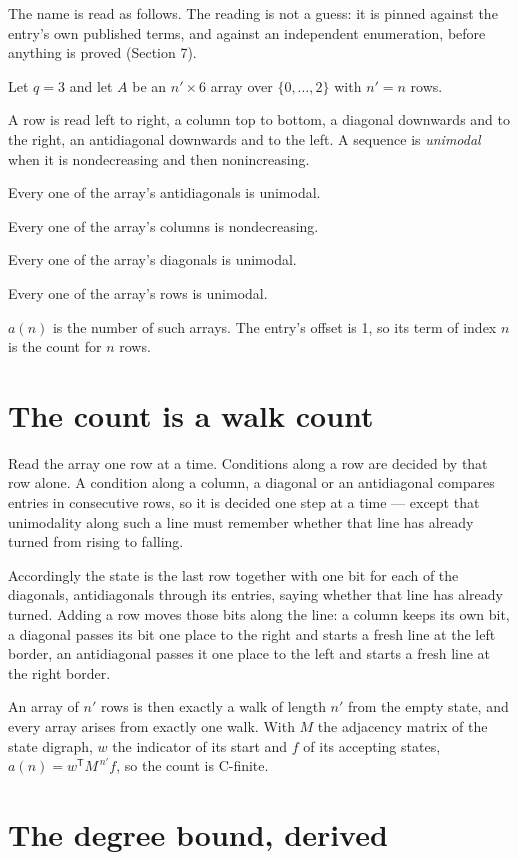 \documentclass[11pt]{article}
\theoremstyle{definition}
\begin{document}
The name is read as follows. The reading is not a guess: it is pinned against the entry's own published terms, and against an independent enumeration, before anything is proved (Section 7).

Let $q = 3$ and let $A$ be an $n' \times 6$ array over $\{0,\dots,2\}$ with $n' = n$ rows.

A row is read left to right, a column top to bottom, a diagonal downwards and to the right, an antidiagonal downwards and to the left. A sequence is {\itshape unimodal} when it is nondecreasing and then nonincreasing.

Every one of the array's antidiagonals is unimodal.

Every one of the array's columns is nondecreasing.

Every one of the array's diagonals is unimodal.

Every one of the array's rows is unimodal.

$a(n)$ is the number of such arrays. The entry's offset is 1, so its term of index $n$ is the count for $n$ rows.

\section{The count is a walk count}

Read the array one row at a time. Conditions along a row are decided by that row alone. A condition along a column, a diagonal or an antidiagonal compares entries in consecutive rows, so it is decided one step at a time --- except that unimodality along such a line must remember whether that line has already turned from rising to falling.

Accordingly the state is the last row together with one bit for each of the diagonals, antidiagonals through its entries, saying whether that line has already turned. Adding a row moves those bits along the line: a column keeps its own bit, a diagonal passes its bit one place to the right and starts a fresh line at the left border, an antidiagonal passes it one place to the left and starts a fresh line at the right border.

An array of $n'$ rows is then exactly a walk of length $n'$ from the empty state, and every array arises from exactly one walk. With $M$ the adjacency matrix of the state digraph, $w$ the indicator of its start and $f$ of its accepting states, $a(n) = w^{\mathsf T}M^{\,n'}f$, so the count is C-finite.

\section{The degree bound, derived}
\end{document}
